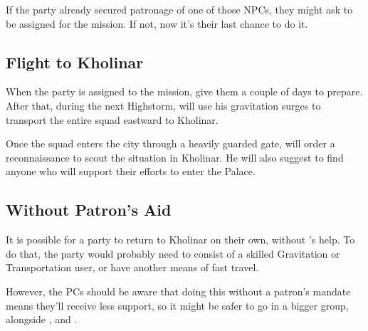 If the party already secured patronage of one of those NPCs, they might ask to be assigned for the mission. If not, now it's their last chance to do it.



\subsection{Flight to Kholinar}

When the party is assigned to the mission, give them a couple of days to prepare. After that, during the next Highstorm, \npcKaladin{} will use his gravitation surges to transport the entire squad eastward to Kholinar.

Once the squad enters the city through a heavily guarded gate, \npcElhokar{} will order a reconnaissance to scout the situation in Kholinar. He will also suggest to find anyone who will support their efforts to enter the Palace.



\subsection{Without Patron's Aid}

It is possible for a party to return to Kholinar on their own, without \npcKaladin{}'s help. To do that, the party would probably need to consist of a skilled Gravitation or Transportation user, or have another means of fast travel.

However, the PCs should be aware that doing this without a patron's mandate means they'll receive less support, so it might be safer to go in a bigger group, alongside \npcAdolin{}, \npcKaladin{} and \npcShallan{}.